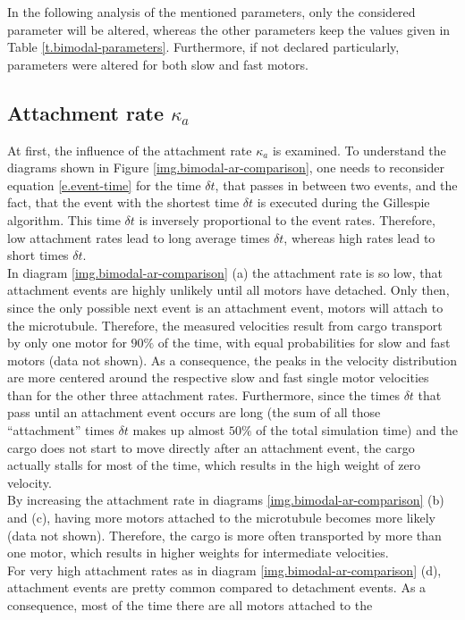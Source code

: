 In the following analysis of the mentioned parameters, only the considered parameter will be altered, whereas the other parameters keep the values given in Table \ref{t.bimodal-parameters}. 
Furthermore, if not declared particularly, parameters were altered for both slow and fast motors.

\subsection{Attachment rate $\kappa_a$}\label{ss.attachment-rate}
At first, the influence of the attachment rate $\kappa_a$ is examined. To understand the diagrams shown in Figure \ref{img.bimodal-ar-comparison}, one needs to reconsider equation
\eqref{e.event-time} for the time $\delta t$, that passes in between two events, and the fact, that the event with the shortest time $\delta t$ is executed during the Gillespie algorithm. This time
$\delta t$ is inversely proportional to the event rates. Therefore, low attachment rates lead to long average times $\delta t$, whereas high rates lead to short times $\delta t$. \\
In diagram \ref{img.bimodal-ar-comparison} (a) the attachment rate is so low, that attachment events are highly unlikely until all motors have detached. Only then, since the only possible next
event is an attachment event, motors will attach to the microtubule. Therefore, the measured velocities result from cargo transport by only one motor for $90\%$ of the time, with equal
probabilities for slow and fast motors (data not shown). As a consequence, the peaks in the velocity distribution are more centered around the respective slow and fast single motor velocities than for the other
three attachment rates. Furthermore, since the times $\delta t$ that pass until an attachment event occurs are long (the sum of all those ``attachment'' times $\delta t$ makes up almost $50\%$ of
the total simulation time) and the cargo does not start to move directly after an attachment event, the cargo actually stalls for most of the time, which results in the high weight of zero
velocity. \\
By increasing the attachment rate in diagrams \ref{img.bimodal-ar-comparison} (b) and (c), having more motors attached to the microtubule becomes more likely (data not shown). Therefore, the cargo is more often transported by more than one motor,
which results in higher weights for intermediate velocities. \\
For very high attachment rates as in diagram \ref{img.bimodal-ar-comparison} (d), attachment events are pretty common compared to detachment events. As a consequence, most of the time there are all motors attached to the
